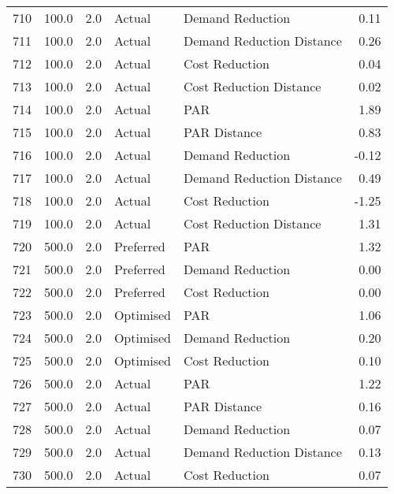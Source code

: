 \begin{longtable}{lrrllr}
710  &        100.0 &     2.0 &         Actual &           Demand Reduction &   0.11 \\
711  &        100.0 &     2.0 &         Actual &  Demand Reduction Distance &   0.26 \\
712  &        100.0 &     2.0 &         Actual &             Cost Reduction &   0.04 \\
713  &        100.0 &     2.0 &         Actual &    Cost Reduction Distance &   0.02 \\
714  &        100.0 &     2.0 &         Actual &                        PAR &   1.89 \\
715  &        100.0 &     2.0 &         Actual &               PAR Distance &   0.83 \\
716  &        100.0 &     2.0 &         Actual &           Demand Reduction &  -0.12 \\
717  &        100.0 &     2.0 &         Actual &  Demand Reduction Distance &   0.49 \\
718  &        100.0 &     2.0 &         Actual &             Cost Reduction &  -1.25 \\
719  &        100.0 &     2.0 &         Actual &    Cost Reduction Distance &   1.31 \\
720  &        500.0 &     2.0 &      Preferred &                        PAR &   1.32 \\
721  &        500.0 &     2.0 &      Preferred &           Demand Reduction &   0.00 \\
722  &        500.0 &     2.0 &      Preferred &             Cost Reduction &   0.00 \\
723  &        500.0 &     2.0 &      Optimised &                        PAR &   1.06 \\
724  &        500.0 &     2.0 &      Optimised &           Demand Reduction &   0.20 \\
725  &        500.0 &     2.0 &      Optimised &             Cost Reduction &   0.10 \\
726  &        500.0 &     2.0 &         Actual &                        PAR &   1.22 \\
727  &        500.0 &     2.0 &         Actual &               PAR Distance &   0.16 \\
728  &        500.0 &     2.0 &         Actual &           Demand Reduction &   0.07 \\
729  &        500.0 &     2.0 &         Actual &  Demand Reduction Distance &   0.13 \\
730  &        500.0 &     2.0 &         Actual &             Cost Reduction &   0.07 \\

\end{longtable}
